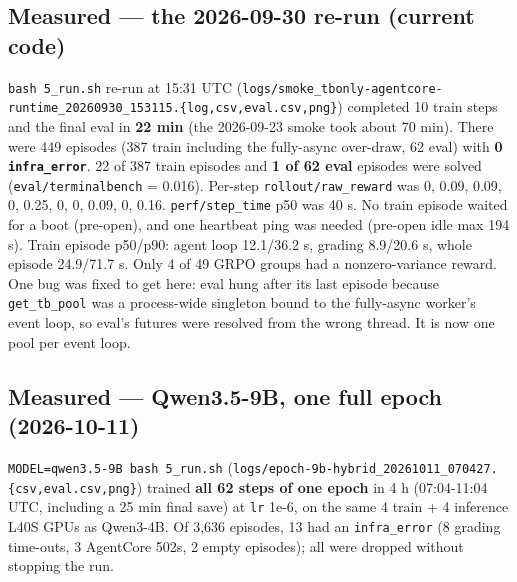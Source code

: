 \documentclass[
  paper=a4,
  ,captions=tableheading
]{scrartcl}
\begin{document}
\hypertarget{measured-the-2026-09-30-re-run-current-code}{%
\subsection{Measured --- the 2026-09-30 re-run (current
code)}\label{measured-the-2026-09-30-re-run-current-code}}

\texttt{bash\ 5\_run.sh} re-run at 15:31 UTC
(\texttt{logs/smoke\_tbonly-agentcore-runtime\_20260930\_153115.\{log,csv,eval.csv,png\}})
completed 10 train steps and the final eval in \textbf{22 min} (the
2026-09-23 smoke took about 70 min). There were 449 episodes (387 train
including the fully-async over-draw, 62 eval) with \textbf{0
\texttt{infra\_error}}. 22 of 387 train episodes and \textbf{1 of 62
eval} episodes were solved (\texttt{eval/terminalbench} = 0.016).
Per-step \texttt{rollout/raw\_reward} was 0, 0.09, 0.09, 0, 0.25, 0, 0,
0.09, 0, 0.16. \texttt{perf/step\_time} p50 was 40 s. No train episode
waited for a boot (pre-open), and one heartbeat ping was needed
(pre-open idle max 194 s). Train episode p50/p90: agent loop 12.1/36.2
s, grading 8.9/20.6 s, whole episode 24.9/71.7 s. Only 4 of 49 GRPO
groups had a nonzero-variance reward. One bug was fixed to get here:
eval hung after its last episode because \texttt{get\_tb\_pool} was a
process-wide singleton bound to the fully-async worker's event loop, so
eval's futures were resolved from the wrong thread. It is now one pool
per event loop.

\hypertarget{measured-qwen3.5-9b-one-full-epoch-2026-10-11}{%
\subsection{Measured --- Qwen3.5-9B, one full epoch
(2026-10-11)}\label{measured-qwen3.5-9b-one-full-epoch-2026-10-11}}

\texttt{MODEL=qwen3.5-9B\ bash\ 5\_run.sh}
(\texttt{logs/epoch-9b-hybrid\_20261011\_070427.\{csv,eval.csv,png\}})
trained \textbf{all 62 steps of one epoch} in 4 h (07:04-11:04 UTC,
including a 25 min final save) at \texttt{lr} 1e-6, on the same 4 train
+ 4 inference L40S GPUs as Qwen3-4B. Of 3,636 episodes, 13 had an
\texttt{infra\_error} (8 grading time-outs, 3 AgentCore 502s, 2 empty
episodes); all were dropped without stopping the run.
\end{document}
